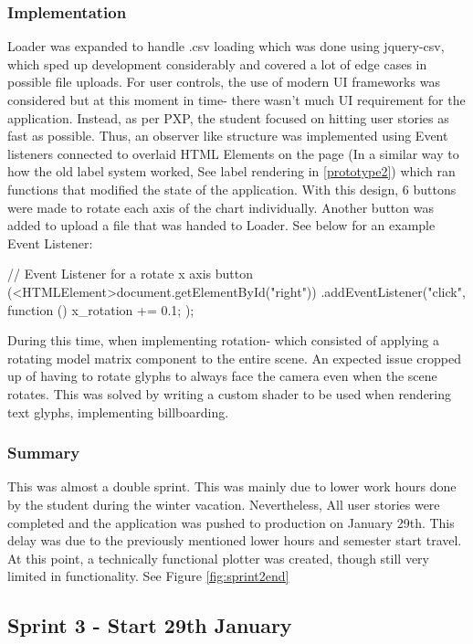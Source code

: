 \subsubsection{Implementation}
Loader was expanded to handle .csv loading which was done using jquery-csv, which sped up development considerably and covered a lot of edge cases in possible file uploads. For user controls, the use of modern UI frameworks was considered but at this moment in time- there wasn't much UI requirement for the application. Instead, as per PXP, the student focused on hitting user stories as fast as possible. Thus, an observer like structure was implemented using Event listeners connected to overlaid HTML Elements on the page (In a similar way to how the old label system worked, See label rendering in \ref{prototype2}) which ran functions that modified the state of the application. With this design, 6 buttons were made to rotate each axis of the chart individually. Another button was added to upload a file that was handed to Loader. See below for an example Event Listener:

\begin{code}
    // Event Listener for a rotate x axis button
    (<HTMLElement>document.getElementById("right"))
    .addEventListener("click", function () {
            x_rotation += 0.1;
        });
\end{code}

During this time, when implementing rotation- which consisted of applying a rotating model matrix component to the entire scene. An expected issue cropped up of having to rotate glyphs to always face the camera even when the scene rotates. This was solved by writing a custom shader to be used when rendering text glyphs, implementing billboarding.

\subsubsection{Summary}
This was almost a double sprint. This was mainly due to lower work hours done by the student during the winter vacation. Nevertheless, All user stories were completed and the application was pushed to production on January 29th. This delay was due to the previously mentioned lower hours and semester start travel. At this point, a technically functional plotter was created, though still very limited in functionality. See Figure \ref{fig:sprint2end}

\subsection{Sprint 3 - Start 29th January}
